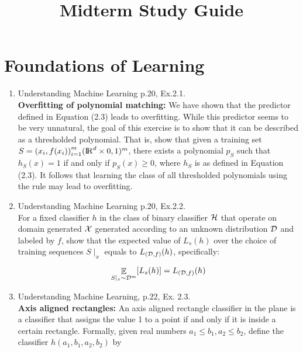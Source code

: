 \documentclass[12pt]{article}
\title{Midterm Study Guide}
\theoremstyle{definition}
\DeclareMathOperator*{\E}{\mathbb{E}}
\begin{document}
\maketitle

\section{Foundations of Learning}
\begin{enumerate}

\item Understanding Machine Learning p.20, Ex.2.1. \\
\textbf{Overfitting of polynomial matching:} We have shown that the predictor defined 
in Equation (2.3) leads to overfitting. While this predictor seems to be 
very unnatural, the goal of this exercise is to show that it can be described as a thresholded 
polynomial. That is, show that given a training set 
$S ={ (x_{i} , f (x_{i}))}_{i=1}^{m} ({\rm I\!R} ^{d} \times {0, 1})^{m}$,
 there exists a polynomial $p_{S}$ such that 
$h_{S}(x) = 1$ if and only if $p_{S}(x) \geq 0$, where $h_{S}$ is as defined in Equation (2.3). 
It follows that learning the class of all thresholded polynomials using the 
 rule may lead to overfitting.\\

\item Understanding Machine Learning p.20, Ex.2.2.\\
For a fixed classifier $h$ in the class of binary
classifier ${\cal H}$ that operate on domain generated
${\cal X}$ generated according to an unknown distribution
${\cal D}$ and labeled by $f$, show that the expected value
of $L_{s}(h)$ over the choice of training sequences $S\mid_x$
equals to $L_{({\cal D}, f)}(h)$, specifically:

\[ \E_{S\mid_x \sim {{\cal{D}}^{m}}} [L_{s}(h)] = L_{({\cal D}, f)}(h)\]


\item Understanding Machine Learning, p.22, Ex. 2.3.\\
\textbf{Axis aligned rectangles:} An axis aligned rectangle classifier 
in the plane is a classifier that assigns the value 1 to a point if 
and only if it is inside a certain rectangle. 
Formally, given real numbers $a_{1} \leq b_{1},a_{2} \leq b_{2}$, 
define the classifier $h(a_{1},b_{1},a_{2},b_{2})$ by


\end{enumerate}
\end{document}
